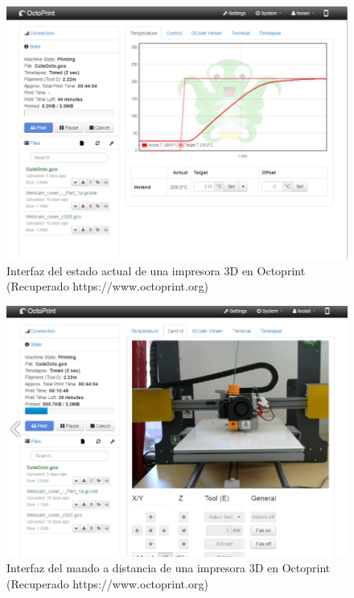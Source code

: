\begin{figure}[H]
\centering
\includegraphics[scale=0.5]{images/octoprint.png}
\caption{Interfaz del estado actual de una impresora 3D en Octoprint (Recuperado https://www.octoprint.org)}
\end{figure}

\begin{figure}[H]
\centering
\includegraphics[scale=0.5]{images/octoprint2.png}
\caption{Interfaz del mando a distancia de una impresora 3D en Octoprint (Recuperado https://www.octoprint.org)}
\end{figure}


